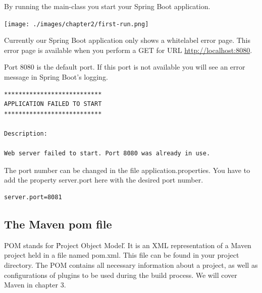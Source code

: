 \documentclass[a4paper, 12pt]{report}
\begin{document}
By running the main-class you start your Spring Boot application. 

\texttt{[image: ./images/chapter2/first-run.png]}

Currently our Spring Boot application only shows a whitelabel error page. This error page is available when you perform a GET for URL \url{http://localhost:8080}.


Port 8080 is the default port. If this port is not available you will see an error message in Spring Boot's logging.

\begin{lstlisting}[frame=single]
***************************
APPLICATION FAILED TO START
***************************

Description:

Web server failed to start. Port 8080 was already in use.
\end{lstlisting}

The port number can be changed in the file application.properties. You have to add the property server.port here with the desired port number.

\begin{lstlisting}[frame=single]
server.port=8081
\end{lstlisting}

\subsection{The Maven pom file}

POM stands for \'Project Object Model\'. It is an XML representation of a Maven project held in a file named pom.xml. This file can be found in your project directory. The POM contains all necessary information about a project, as well as configurations of plugins to be used during the build process. We will cover Maven in chapter 3.
\end{document}
